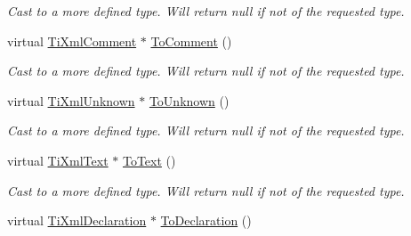 \begin{DoxyCompactItemize}
\begin{DoxyCompactList}\small\item\em Cast to a more defined type. Will return null if not of the requested type. \item\end{DoxyCompactList}\item 
\hypertarget{class_ti_xml_node_a383e06a0787f7063953934867990f849}{
virtual \hyperlink{class_ti_xml_comment}{TiXmlComment} $\ast$ \hyperlink{class_ti_xml_node_a383e06a0787f7063953934867990f849}{ToComment} ()}
\label{class_ti_xml_node_a383e06a0787f7063953934867990f849}

\begin{DoxyCompactList}\small\item\em Cast to a more defined type. Will return null if not of the requested type. \item\end{DoxyCompactList}\item 
\hypertarget{class_ti_xml_node_a06de5af852668c7e4af0d09c205f0b0d}{
virtual \hyperlink{class_ti_xml_unknown}{TiXmlUnknown} $\ast$ \hyperlink{class_ti_xml_node_a06de5af852668c7e4af0d09c205f0b0d}{ToUnknown} ()}
\label{class_ti_xml_node_a06de5af852668c7e4af0d09c205f0b0d}

\begin{DoxyCompactList}\small\item\em Cast to a more defined type. Will return null if not of the requested type. \item\end{DoxyCompactList}\item 
\hypertarget{class_ti_xml_node_a3ddfbcac78fbea041fad57e5c6d60a03}{
virtual \hyperlink{class_ti_xml_text}{TiXmlText} $\ast$ \hyperlink{class_ti_xml_node_a3ddfbcac78fbea041fad57e5c6d60a03}{ToText} ()}
\label{class_ti_xml_node_a3ddfbcac78fbea041fad57e5c6d60a03}

\begin{DoxyCompactList}\small\item\em Cast to a more defined type. Will return null if not of the requested type. \item\end{DoxyCompactList}\item 
\hypertarget{class_ti_xml_node_a4027136ca820ff4a636b607231b6a6df}{
virtual \hyperlink{class_ti_xml_declaration}{TiXmlDeclaration} $\ast$ \hyperlink{class_ti_xml_node_a4027136ca820ff4a636b607231b6a6df}{ToDeclaration} ()}
\label{class_ti_xml_node_a4027136ca820ff4a636b607231b6a6df}


\end{DoxyCompactItemize}
